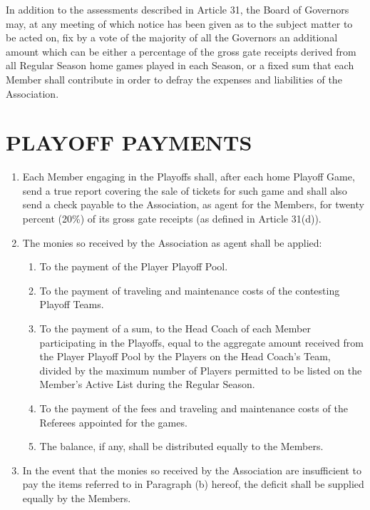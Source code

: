 \documentclass[]{book}
\providecommand{\tightlist}{%
  \setlength{\itemsep}{0pt}\setlength{\parskip}{0pt}}
\begin{document}
In addition to the assessments described in Article 31, the Board of Governors may, at any meeting of which notice has been given as to the subject matter to be acted on, fix by a vote of the majority of all the Governors an additional amount which can be either a percentage of the gross gate receipts derived from all Regular Season home games played in each Season, or a fixed sum that each Member shall contribute in order to defray the expenses and liabilities of the Association.

\hypertarget{playoff-payments}{%
\section{PLAYOFF PAYMENTS}\label{playoff-payments}}

\begin{enumerate}
\def\labelenumi{(\alph{enumi})}
\tightlist
\item
  Each Member engaging in the Playoffs shall, after each home Playoff Game, send a true report covering the sale of tickets for such game and shall also send a check payable to the Association, as agent for the Members, for twenty percent (20\%) of its gross gate receipts (as defined in Article 31(d)).
\item
  The monies so received by the Association as agent shall be applied:

  \begin{enumerate}
  \def\labelenumii{(\roman{enumii})}
  \tightlist
  \item
    To the payment of the Player Playoff Pool.
  \item
    To the payment of traveling and maintenance costs of the contesting Playoff Teams.
  \item
    To the payment of a sum, to the Head Coach of each Member participating in the Playoffs, equal to the aggregate amount received from the Player Playoff Pool by the Players on the Head Coach's Team, divided by the maximum number of Players permitted to be listed on the Member's Active List during the Regular Season.
  \item
    To the payment of the fees and traveling and maintenance costs of the Referees appointed for the games.
  \item
    The balance, if any, shall be distributed equally to the Members.
  \end{enumerate}
\item
  In the event that the monies so received by the Association are insufficient to pay the items referred to in Paragraph (b) hereof, the deficit shall be supplied equally by the Members.
\end{enumerate}
\end{document}
